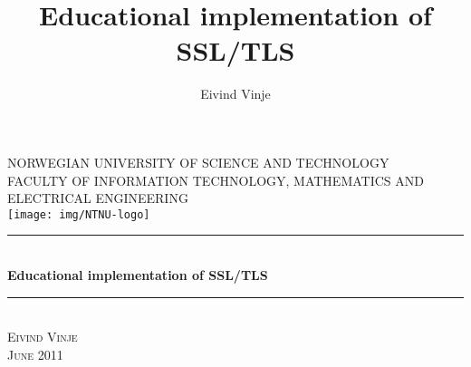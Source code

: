 \documentclass[12pt,a4paper,titlepage]{report}
\begin{document}
\sloppy

\title{Educational implementation of SSL/TLS}
\author{Eivind Vinje}

\begin{titlepage}
\begin{center}
\textsc{NORWEGIAN UNIVERSITY OF SCIENCE AND TECHNOLOGY\\
FACULTY OF  INFORMATION TECHNOLOGY, MATHEMATICS AND ELECTRICAL ENGINEERING} \\
\vspace{0.5cm} 
\texttt{[image: img/NTNU-logo]} \\
\vspace{2.5cm} 
\rule{\linewidth}{0.5mm} \\[0.4cm]
{\huge \bfseries Educational implementation of SSL/TLS}\\[0.4cm] 
\rule{\linewidth}{0.5mm} \\[3.5cm]
\textsc{\Large Eivind Vinje}\\[1.4cm]
\textsc{\Large June 2011}\\
\end{center}
\end{titlepage}
\end{document}
